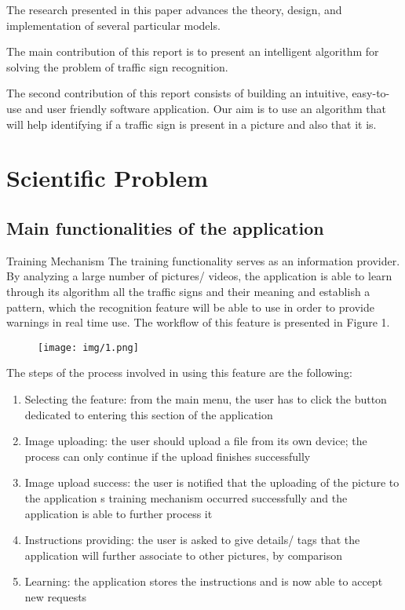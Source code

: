 \documentclass[runningheads,a4paper,11pt]{report}
\begin{document}
The research presented in this paper advances the theory, design, and implementation of several particular models. 

The main contribution of this report is to present an intelligent algorithm for solving the problem of traffic sign recognition.

The second contribution of this report consists of building an intuitive, easy-to-use and user
friendly software application. Our aim is to use an algorithm that will help identifying if a traffic sign is present in a picture and also that it is.


\chapter{Scientific Problem}
\label{section:scientificProblem}


\section{Main functionalities of the application}
\label{section:problemDefinition}

Training Mechanism
The training functionality serves as an information provider. By analyzing a large number of pictures/ videos, the application is able to learn through its algorithm all the traffic signs and their meaning and establish a pattern, which the recognition feature will be able to use in order to provide warnings in real time use. The workflow of this feature is presented in Figure 1.

\begin{figure}[h]
\texttt{[image: img/1.png]}
\centering
\end{figure}


The steps of the process involved in using this feature are the following:
\begin{enumerate}
  \item Selecting the feature: from the main menu, the user has to click the button dedicated to entering this section of the application
  \item Image uploading: the user should upload a file from its own device; the process can only continue if the upload finishes successfully
  \item  Image upload success: the user is notified that the uploading of the picture to the application s training mechanism occurred successfully and the application is able to further process it
  \item Instructions providing: the user is asked to give details/ tags that the application will further associate to other pictures, by comparison
  \item Learning: the application stores the instructions and is now able to accept new requests
\end{enumerate}
\end{document}
